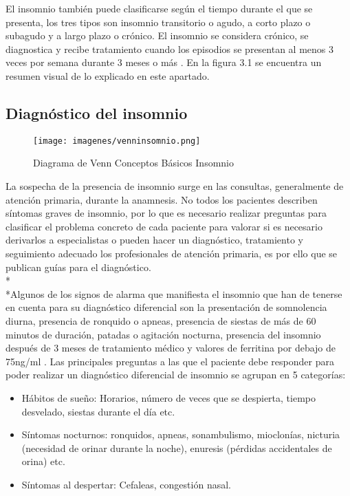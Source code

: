 \documentclass[a4paper,12pt,twoside]{memoir}
\begin{document}
\begin{itemize}
    \text El insomnio también puede clasificarse según el tiempo durante el que se presenta, los  tres tipos son insomnio transitorio o agudo, a corto plazo o subagudo y a largo plazo o crónico. El insomnio se considera crónico, se diagnostica y recibe tratamiento cuando los episodios se presentan al menos 3 veces por semana durante 3 meses o más \cite{diagnosisNHLBI}.
En la figura 3.1 se encuentra un resumen visual de lo explicado en este apartado.
    \subsection{Diagnóstico del insomnio}
    \begin{figure}
    \centering
    \texttt{[image: imagenes/venninsomnio.png]}
    \caption{Diagrama de Venn Conceptos Básicos Insomnio}
    \label{fig:enter-label}
\end{figure}
    \text La sospecha de la presencia de insomnio surge en las consultas, generalmente de atención primaria, durante la anamnesis. No todos los pacientes describen síntomas graves de insomnio, por lo que es necesario realizar preguntas para clasificar el problema concreto de cada paciente para valorar si es necesario derivarlos a especialistas o pueden hacer un diagnóstico, tratamiento y seguimiento adecuado los profesionales de atención primaria, es por ello que se publican guías para el diagnóstico.\\*\\*Algunos de los signos de alarma que manifiesta el insomnio que han de tenerse en cuenta para su diagnóstico diferencial son la presentación de somnolencia diurna, presencia de ronquido o apneas, presencia de siestas de más de 60 minutos de duración, patadas o agitación nocturna, presencia del insomnio después de 3 meses de tratamiento médico y valores de ferritina por debajo de 75ng/ml \cite{ferre2020}. Las principales preguntas a las que el paciente debe responder para poder realizar un diagnóstico diferencial de insomnio se agrupan en 5 categorías:
    \begin{itemize}
        \item Hábitos de sueño: Horarios, número de veces que se despierta, tiempo desvelado, siestas durante el día etc.
        \item Síntomas nocturnos:  ronquidos, apneas, sonambulismo, mioclonías, nicturia (necesidad de orinar durante la noche), enuresis (pérdidas accidentales de orina) etc.
        \item Síntomas al despertar: Cefaleas, congestión nasal.

\end{itemize}
\end{itemize}
\end{document}
